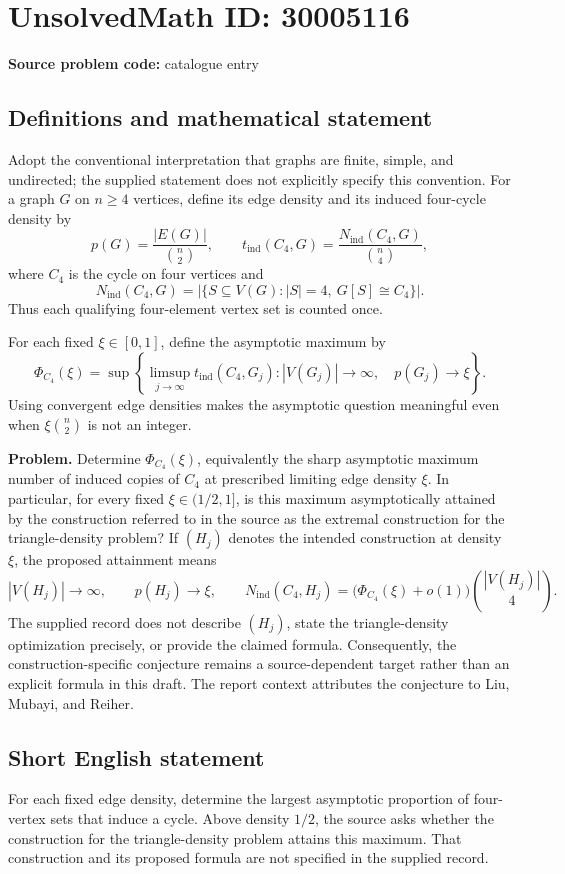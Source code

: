\documentclass[11pt]{article}
\begin{document}
\section*{UnsolvedMath ID: 30005116}
\textbf{Source problem code:} catalogue entry
\subsection{Definitions and mathematical statement}
Adopt the conventional interpretation that graphs are finite, simple, and undirected; the supplied statement does not explicitly specify this convention. For a graph \(G\) on \(n\geq 4\) vertices, define its edge density and its induced four-cycle density by
\[
 p(G)=\frac{|E(G)|}{\binom{n}{2}},\qquad
 t_{\mathrm{ind}}(C_4,G)=\frac{N_{\mathrm{ind}}(C_4,G)}{\binom{n}{4}},
\]
where \(C_4\) is the cycle on four vertices and
\[
 N_{\mathrm{ind}}(C_4,G)
 =\bigl|\{S\subseteq V(G): |S|=4,\ G[S]\cong C_4\}\bigr|.
\]
Thus each qualifying four-element vertex set is counted once.

For each fixed \(\xi\in[0,1]\), define the asymptotic maximum by
\[
 \Phi_{C_4}(\xi)=
 \sup\left\{
 \limsup_{j\to\infty}t_{\mathrm{ind}}(C_4,G_j):
 |V(G_j)|\to\infty,\quad p(G_j)\to\xi
 \right\}.
\]
Using convergent edge densities makes the asymptotic question meaningful even when \(\xi\binom{n}{2}\) is not an integer.

\textbf{Problem.} Determine \(\Phi_{C_4}(\xi)\), equivalently the sharp asymptotic maximum number of induced copies of \(C_4\) at prescribed limiting edge density \(\xi\). In particular, for every fixed \(\xi\in(1/2,1]\), is this maximum asymptotically attained by the construction referred to in the source as the extremal construction for the triangle-density problem? If \((H_j)\) denotes the intended construction at density \(\xi\), the proposed attainment means
\[
 |V(H_j)|\to\infty,\qquad p(H_j)\to\xi,
 \qquad
 N_{\mathrm{ind}}(C_4,H_j)
 =\bigl(\Phi_{C_4}(\xi)+o(1)\bigr)
   \binom{|V(H_j)|}{4}.
\]
The supplied record does not describe \((H_j)\), state the triangle-density optimization precisely, or provide the claimed formula. Consequently, the construction-specific conjecture remains a source-dependent target rather than an explicit formula in this draft. The report context attributes the conjecture to Liu, Mubayi, and Reiher.
\subsection{Short English statement}
For each fixed edge density, determine the largest asymptotic proportion of four-vertex sets that induce a cycle. Above density \(1/2\), the source asks whether the construction for the triangle-density problem attains this maximum. That construction and its proposed formula are not specified in the supplied record.
\end{document}
